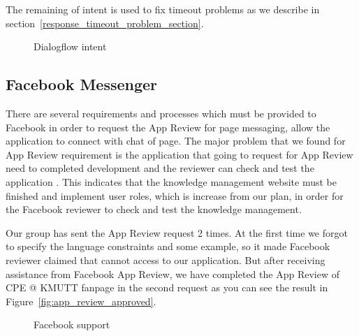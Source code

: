 \documentclass[12pt,oneside,openright,a4paper]{cpe-english-project}
\begin{document}
The remaining of intent is used to fix timeout problems as we describe in section~\ref*{response_timeout_problem_section}.

\begin{figure}[!h]\centering
	\caption{Dialogflow intent}\label{fig:Dialogflow intent}
\end{figure}

\pagebreak
\subsection{Facebook Messenger}
\label{fb_messenger}
	There are several requirements and processes which must be
	provided to Facebook in order to request the App Review for page messaging,
	allow the application to connect with chat of page.
	The major problem that we found for App Review requirement is
	the application that going to request for App Review need to completed development and 
	the reviewer can check and test the application \cite{before_you_submit}.
	This indicates that the knowledge management website must be finished and
	implement user roles, which is increase from our plan,
	in order for the Facebook reviewer to check and test the knowledge management.

	Our group has sent the App Review request 2 times. At the first time we forgot to specify the
	language constraints and some example, so it made Facebook reviewer claimed that
	cannot access to our application. But after receiving assistance from Facebook App Review,
	we have completed the App Review of CPE @ KMUTT fanpage in the second request
	as you can see the result in Figure~\ref*{fig:app_review_approved}.

	\begin{figure}[!h]\centering
		\caption{Facebook support}\label{fig:Facebook support}
	\end{figure}
\end{document}
